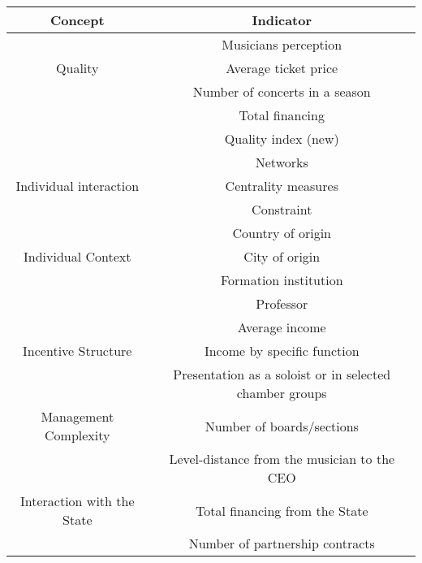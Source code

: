 \documentclass[a4paper, 12pt, openright, oneside, german, french, brazil, english, article]{abntex2}
\begin{document}
	\begin{table}[ht]
		{\begin{tabular}{|c|c|}
				
				\hline
				\textbf{Concept} & \textbf{Indicator} \\
				\hline
				&  Musicians perception \\
				Quality  &  Average ticket price \\
				&  Number of concerts in a season \\
				&  Total financing \\
				&  Quality index (new) \\
				\hline
				
				& Networks \\
				Individual interaction & Centrality measures  \\
				& Constraint      \\
				\hline
				& Country of origin  \\
				Individual Context & City of origin  \\
				& Formation institution \\
				& Professor    \\
				\hline
				& Average income  \\
				Incentive Structure & Income by specific function \\
				& Presentation as a soloist or in selected chamber groups \\
				\hline
				Management Complexity  & Number of boards/sections  \\
				& Level-distance from the musician to the CEO \\
				\hline
				Interaction with the State  & Total financing from the State  \\
				& Number of partnership contracts \\
				\hline
				
				
			\end{tabular}
		}
		{}
		
	\end{table}
	
	
\end{document}
